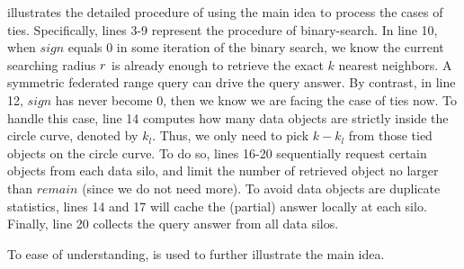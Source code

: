  illustrates the detailed procedure of using the main idea to process the cases of ties.
Specifically, lines 3-9 represent the procedure of binary-search.
In line 10, when $sign$ equals 0 in some iteration of the binary search, we know the current searching radius $r$ is already enough to retrieve the exact $k$ nearest neighbors.
A symmetric federated range query can drive the query answer.
By contrast, in line 12, $sign$ has never become $0$, then we know we are facing the case of ties now.
To handle this case, line 14 computes how many data objects are strictly inside the circle curve, denoted by $k_l$.
Thus, we only need to pick $k-k_l$ from those tied objects on the circle curve.
To do so, lines 16-20 sequentially request certain objects from each data silo, and limit the number of retrieved object no larger than $remain$ (since we do not need more).
To avoid data objects are duplicate statistics, lines 14 and 17 will cache the (partial) answer locally at each silo.
Finally, line 20 collects the query answer from all data silos.

To ease of understanding,  is used to further illustrate the main idea.

